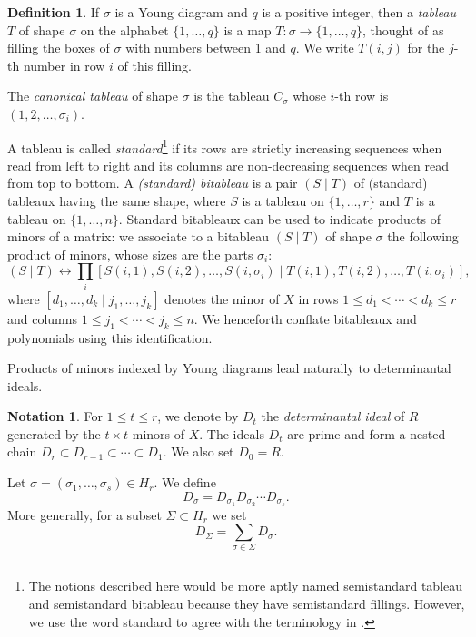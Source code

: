\documentclass[11pt, reqno]{amsart}
\numberwithin{equation}{section}
\theoremstyle{definition}
\newtheorem{definition}[theorem]{Definition}
\newtheorem{notation}[theorem]{Notation}
\begin{document}
\begin{definition}\label{def: standard}
If $\sigma$ is a Young diagram and $q$ is a positive integer, then a {\em tableau} $T$ of shape $\sigma$ on the alphabet $\{1,\ldots,q\}$ is a map $T:\sigma \to \{1,\ldots,q\}$, thought of as filling the boxes of $\sigma$ with numbers between 1 and $q$. We write $T(i,j)$ for the $j$-th number in row $i$ of this filling.

The {\em canonical tableau} of shape $\sigma$ is the  tableau $C_\sigma$ whose $i$-th row is $(1,2, \ldots, \sigma_i)$.

A tableau is called {\em standard}\footnote{The notions described here would be more aptly named semistandard tableau and semistandard bitableau because they have semistandard fillings. However, we use the word standard to agree with the terminology in \cite{deconcini1980young, bruns2006determinantal, bruns2022determinants}.}   if its rows are strictly increasing sequences when read from left to right and its columns are non-decreasing sequences when read from top to bottom.
	A {\em (standard) bitableau} is a pair $(S \mid T)$ of (standard) tableaux having the same shape, where $S$ is a tableau on $\{1,\ldots,r\}$ and $T$ is a tableau on $\{1,\ldots,n\}$.
Standard bitableaux can be used to indicate products of minors of a matrix: we associate to a bitableau $(S \mid T)$ of shape $\sigma$ the following product of minors, whose sizes are the parts $\sigma_i$:
 \[
 (S \mid T) \leftrightarrow \prod_i [S(i, 1), S(i, 2), \ldots,  S(i, \sigma_i)\mid  T(i, 1), T(i, 2), \ldots, T(i,\sigma_i)],
 \]
 where $[d_1,\ldots,d_k \mid j_1,\ldots,j_k]$ denotes the minor of $X$ in rows $1\le d_1<\cdots<d_k\le r$  and columns
$1\le j_1<\cdots<j_k\le n$. We henceforth conflate bitableaux and polynomials using this identification.
\end{definition}

Products of minors indexed by Young diagrams lead naturally to determinantal ideals.

\begin{notation}
For $1\le t\le r$, we denote by $D_t$ the \textit{determinantal ideal} of $R$ generated by the $t\times t$ minors of $X$.
The ideals $D_t$ are prime and form a nested chain
$D_r \subset D_{r-1} \subset \cdots \subset D_1$.
We also set $D_0=R$.

Let $\sigma=(\sigma_1,\ldots,\sigma_s)\in H_r$. We define
\begin{equation}\label{eq: Dsigma}
D_\sigma = D_{\sigma_1}D_{\sigma_2}\cdots D_{\sigma_s}.
\end{equation}
More generally, for a subset $\Sigma\subset H_r$ we set
\begin{equation}\label{eq: DSigma}
D_\Sigma=\sum_{\sigma\in\Sigma} D_\sigma.
\end{equation}
\end{notation}
\end{document}
